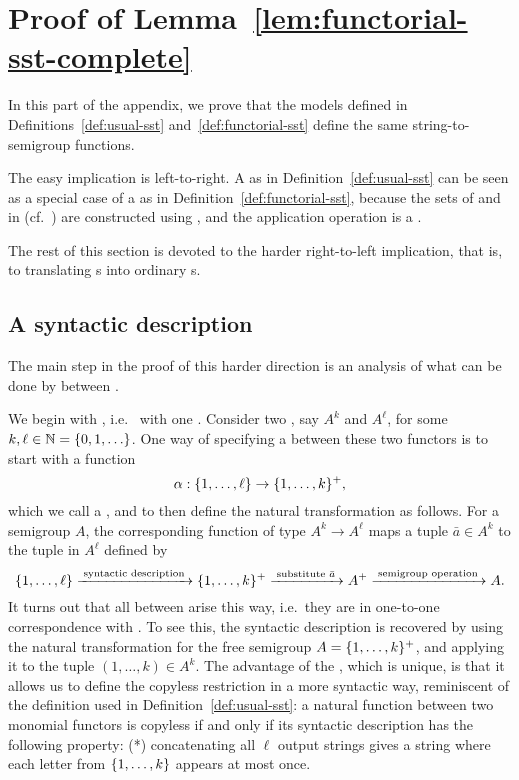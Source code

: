 \section{Proof of Lemma~\ref{lem:functorial-sst-complete}}
In this part of the appendix, we prove that the models defined in Definitions~\ref{def:usual-sst} and~\ref{def:functorial-sst} define the same string-to-semigroup functions.

The easy implication is left-to-right. 
    A  as in Definition~\ref{def:usual-sst} can be seen as a special case of a \functorialsst as in Definition~\ref{def:functorial-sst}, because the sets of  and  in  (cf.~) are constructed using , and the application operation is a . 

The rest of this section is devoted to the harder right-to-left implication, that is, to translating \functorialsst{}s into ordinary \sst{}s.

\subsection{A syntactic description}

The main step in the proof of this harder direction is an analysis of what can be done by  between .

\AP We begin with , i.e.~ with one . 
Consider two , say $A^k$ and $A^\ell$, for some  $k,\ell \in {\mathbb N} = \{0,1,\ldots\}$.
One way of specifying a  between these two functors is to start with a function 
\begin{equation}
\label{eq:syntactic-description}    \alpha : \{1,\ldots,\ell\} \to \{1,\ldots,k\}^+,
\end{equation}
which we call a , and to then  define the  natural transformation as follows. For a semigroup $A$, the corresponding function of type $A^k \to A^\ell$  maps a tuple $\bar a \in A^k$ to the tuple in $A^\ell$ defined by
\[
\{1,\ldots,\ell\}
\xrightarrow{\;\text{syntactic description}\;}
\{1,\ldots,k\}^+ 
\xrightarrow{\;\text{substitute $\bar a$}\;}
A^+
\xrightarrow{\;\text{semigroup operation}\;}
A.
\]
It turns out that all  between  arise this way, i.e.~they are in one-to-one correspondence with . To see this, the syntactic description is recovered by using the natural transformation for the free semigroup $A=\{1,\ldots,k\}^+$, and applying it to the tuple $(1,\ldots,k) \in A^k$.
The advantage of the , which is unique, is that it allows us to define the copyless restriction in a more syntactic way, reminiscent of the definition used in Definition~\ref{def:usual-sst}:  a natural function between two monomial functors is copyless if and only if its syntactic description has the following property: (*) concatenating all $\ell$ output strings gives a string where each letter from $\{1,\ldots,k\}$ appears at most once. 

